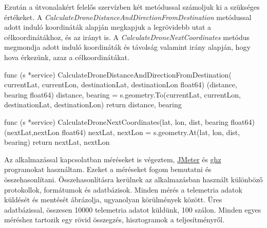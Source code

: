 Ezután a útvonalakért felelős szervízben két metódussal számoljuk ki a szükséges értékeket.
A \textit{CalculateDroneDistanceAndDirectionFromDestination} metódussal adott induló koordináták alapján megkapjuk a legrövidebb utat a célkoordinátákhoz, és az irányt is.
A \textit{CalculateDroneNextCoordinates} metódus megmondja adott induló koordináták és távolság valamint irány alapján, hogy hova érkezünk, azaz a célkoordinátákat.

\begin{python}
    func (s *service) CalculateDroneDistanceAndDirectionFromDestination(
    currentLat, currentLon, destinationLat, destinationLon float64)
    (distance, bearing float64) {
        distance, bearing = s.geometry.To(currentLat,
        currentLon, destinationLat, destinationLon)
        return distance, bearing
    }

    func (s *service) CalculateDroneNextCoordinates(lat, lon,
    dist, bearing float64) (nextLat,nextLon float64) {
        nextLat, nextLon = s.geometry.At(lat, lon, dist, bearing)
        return nextLat, nextLon
    }
\end{python}


Az alkalmazással kapcsolatban méréseket is végeztem, \href{https://github.com/apache/jmeter}{JMeter}  és \href{https://ghz.sh/}{ghz} programokat használtam.
Ezeket a méréseket fogom bemutatni és összehasonlítani.
Összehasonlításra kerülnek az alkalmazásban használt különböző protokollok, formátumok és adatbázisok.
Minden mérés a telemetria adatok küldését és mentését ábrázolja, ugyanolyan körülmények között.
Üres adatbázissal, összesen 10000 telemetria adatot küldünk, 100 szálon.
Minden egyes méréshez tartozik egy rövid összegzés, hisztogramok a teljesítményről.


